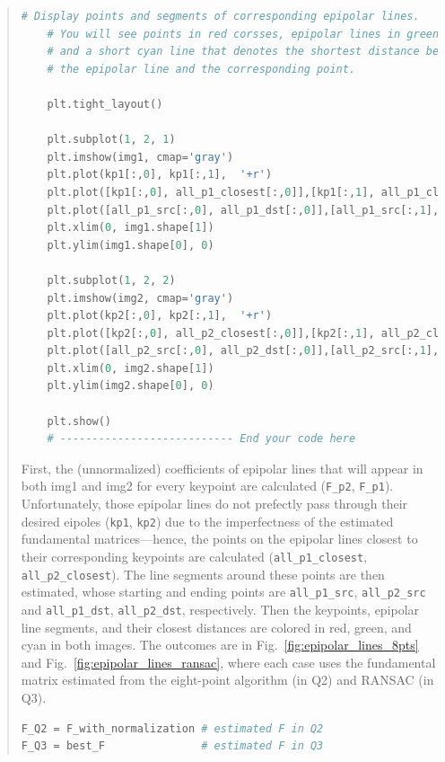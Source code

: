 \documentclass[11pt]{article}
\begin{document}
\begin{quote}
\begin{lstlisting}[language=Python, basicstyle=\scriptsize]
    # Display points and segments of corresponding epipolar lines.
    # You will see points in red corsses, epipolar lines in green 
    # and a short cyan line that denotes the shortest distance between
    # the epipolar line and the corresponding point.
    
    plt.tight_layout()

    plt.subplot(1, 2, 1)
    plt.imshow(img1, cmap='gray')
    plt.plot(kp1[:,0], kp1[:,1],  '+r')
    plt.plot([kp1[:,0], all_p1_closest[:,0]],[kp1[:,1], all_p1_closest[:,1]], 'r')
    plt.plot([all_p1_src[:,0], all_p1_dst[:,0]],[all_p1_src[:,1], all_p1_dst[:,1]], 'g')
    plt.xlim(0, img1.shape[1])
    plt.ylim(img1.shape[0], 0)

    plt.subplot(1, 2, 2)
    plt.imshow(img2, cmap='gray')
    plt.plot(kp2[:,0], kp2[:,1],  '+r')
    plt.plot([kp2[:,0], all_p2_closest[:,0]],[kp2[:,1], all_p2_closest[:,1]], 'r')
    plt.plot([all_p2_src[:,0], all_p2_dst[:,0]],[all_p2_src[:,1], all_p2_dst[:,1]], 'g')
    plt.xlim(0, img2.shape[1])
    plt.ylim(img2.shape[0], 0)
    
    plt.show()
    # --------------------------- End your code here
\end{lstlisting}

First, the (unnormalized) coefficients of epipolar lines that will appear in both img1 and img2 for every keypoint are calculated (\texttt{F\_p2}, \texttt{F\_p1}). Unfortunately, those epipolar lines do not prefectly pass through their desired eipoles (\texttt{kp1}, \texttt{kp2}) due to the imperfectness of the estimated fundamental matrices---hence, the points on the epipolar lines closest to their corresponding keypoints are calculated (\texttt{all\_p1\_closest}, \texttt{all\_p2\_closest}). The line segments around these points are then estimated, whose starting and ending points are \texttt{all\_p1\_src}, \texttt{all\_p2\_src} and \texttt{all\_p1\_dst}, \texttt{all\_p2\_dst}, respectively. Then the keypoints, epipolar line segments, and their closest distances are colored in red, green, and cyan in both images. The outcomes are in Fig.~\ref{fig:epipolar_lines_8pts} and Fig.~\ref{fig:epipolar_lines_ransac}, where each case uses the fundamental matrix estimated from the eight-point algorithm (in Q2) and RANSAC (in Q3).

\begin{lstlisting}[language=Python, basicstyle=\scriptsize]
F_Q2 = F_with_normalization # estimated F in Q2
F_Q3 = best_F               # estimated F in Q3
\end{lstlisting}



\end{quote}
\end{document}
